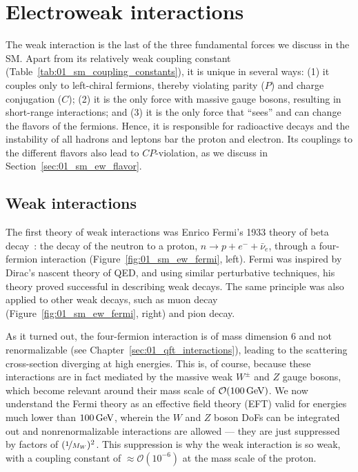 

\section{Electroweak interactions}
\label{sec:01_sm_ew}

The weak interaction is the last of the three fundamental forces we discuss in the SM.
Apart from its relatively weak coupling constant (Table~\ref{tab:01_sm_coupling_constants}), it is unique in several ways: (1) it couples only to left-chiral fermions, thereby violating parity ($P$) and charge conjugation ($C$); (2) it is the only force with massive gauge bosons, resulting in short-range interactions; and (3) it is the only force that ``sees'' and can change the flavors of the fermions.
Hence, it is responsible for radioactive decays and the instability of all hadrons and leptons bar the proton and electron.
Its couplings to the different flavors also lead to $CP$-violation, as we discuss in Section~\ref{sec:01_sm_ew_flavor}.

\subsection{Weak interactions}
\label{sec:01_sm_ew_weak}

The first theory of weak interactions was Enrico Fermi's 1933 theory of beta decay~\cite{Fermi:1934hr}: the decay of the neutron to a proton, $n \to p + e^- + \bar\nu_e$, through a four-fermion interaction (Figure~\ref{fig:01_sm_ew_fermi}, left).
Fermi was inspired by Dirac's nascent theory of QED, and using similar perturbative techniques, his theory proved successful in describing weak decays.
The same principle was also applied to other weak decays, such as muon decay (Figure~\ref{fig:01_sm_ew_fermi}, right) and pion decay.

As it turned out, the four-fermion interaction is of mass dimension $6$ and not renormalizable (see Chapter~\ref{sec:01_qft_interactions}), leading to the scattering cross-section diverging at high energies.
This is, of course, because these interactions are in fact mediated by the massive weak $W^\pm$ and $Z$ gauge bosons, which become relevant around their mass scale of $\mathcal O(100\,\text{Ge\hspace{-.08em}V})$.
We now understand the Fermi theory as an effective field theory (EFT) valid for energies much lower than $100 \,\text{Ge\hspace{-.08em}V}$, wherein the $W$ and $Z$ boson DoFs can be integrated out and nonrenormalizable interactions are allowed --- they are just suppressed by factors of $(\nicefrac{1}{M_W})^2$.
This suppression is why the weak interaction is so weak, with a coupling constant of $\approx \mathcal O(10^{-6})$ at the mass scale of the proton.

